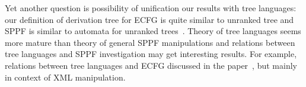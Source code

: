 \documentclass[runningheads,a4paper]{llncs}
\begin{document}
Yet another question is possibility of unification our results with tree languages: our definition of derivation tree for ECFG is quite similar to unranked tree and SPPF is similar to automata for unranked trees~\cite{TATA}.
Theory of tree languages seems more mature than theory of general SPPF manipulations and relations between tree languages and SPPF investigation may get interesting results. For example, relations between tree languages and ECFG discussed in the paper~\cite{TreeLangAndECFG}, but mainly in context of XML manipulation.





\end{document}
